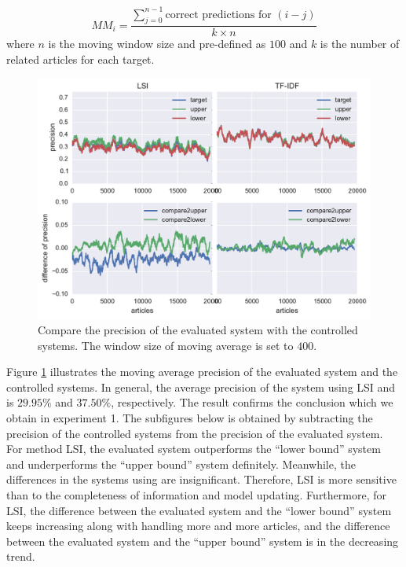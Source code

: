 \begin{equation}
    MM_{i} = \frac{\sum^{n-1}_{j=0} \text{correct predictions for }(i-j)}{k\times n}
\end{equation}
where $n$ is the moving window size and pre-defined as $100$ and $k$ is the number of related articles for each target. 

\begin{figure}[!htb]
    \centering
    \includegraphics[width=\textwidth]{fig/precision_inc}
    \caption{Compare the precision of the evaluated system with the controlled systems. The window size of moving average is set to $400$.}
    \label{fig:predict_inc}
\end{figure}

Figure \ref{fig:predict_inc} illustrates the moving average precision of the evaluated system and the controlled systems. In general, the average precision of the system using LSI and \tfidf{} is $29.95\%$ and $37.50\%$, respectively. The result confirms the conclusion which we obtain in experiment 1. The subfigures below is obtained by subtracting the precision of the controlled systems from the precision of the evaluated system. For method LSI, the evaluated system outperforms the ``lower bound'' system and underperforms the ``upper bound'' system definitely. Meanwhile, the differences in the systems using \tfidf{} are insignificant. Therefore, LSI is more sensitive than \tfidf{} to the completeness of information and model updating. Furthermore, for LSI, the difference between the evaluated system and the ``lower bound'' system keeps increasing along with handling more and more articles, and the difference between the evaluated system and the ``upper bound'' system is in the decreasing trend. 

